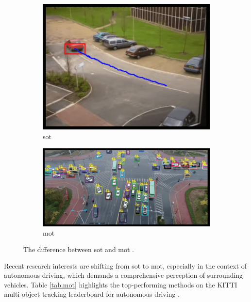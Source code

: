 \begin{figure}[t]
    \centering
    \begin{subfigure}[b]{0.38\textwidth}
        \centering
        \includegraphics[width=\linewidth]{figures/chapter_tracking/sot.png}
        \caption{\acrshort{sot} }
        \label{fig:sot} 
    \end{subfigure}
    \begin{subfigure}[b]{0.61\textwidth}
        \centering
        \includegraphics[width=\linewidth]{figures/chapter_tracking/mot.png}
        \caption{\acrshort{mot}}
        \label{fig:mot}
    \end{subfigure}
  \caption{The difference between \acrfull{sot} \citep{jansari2013real} and \acrfull{mot} \citep{liu2022multi}.}
  \label{fig:tracking}
\end{figure}

Recent research interests are shifting from \acrshort{sot} to \acrshort{mot}, especially in the context of autonomous driving, which demands a comprehensive perception of surrounding vehicles. Table \ref{tab.mot} highlights the top-performing methods on the KITTI multi-object tracking leaderboard for autonomous driving \citep{Geiger2012CVPR}.


